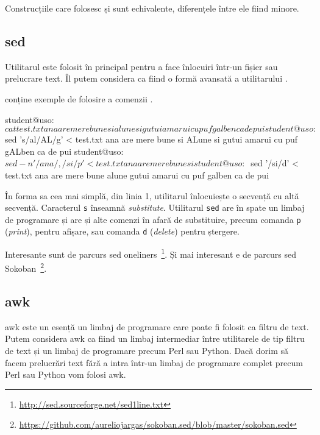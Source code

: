 Construcțiile care folosesc  și  sunt echivalente, diferențele între ele fiind minore.

\subsection{sed}
\label{sec:cli:advanced:sed}

Utilitarul  este folosit în principal pentru a face înlocuiri într-un fișier sau prelucrare text. Îl putem considera ca fiind o formă avansată a utilitarului .

 conține exemple de folosire a comenzii .

\begin{screen}[caption={Folosirea sed},label={lst:cli:sed}]
student@uso:~$ cat test.txt
ana
are
mere
bune
si
alune
si
gutui
amarui
cu
puf
galben
ca
de
pui
student@uso:~$ sed 's/al/AL/g' < test.txt
ana
are
mere
bune
si
ALune
si
gutui
amarui
cu
puf
gALben
ca
de
pui
student@uso:~$ sed -n '/ana/,/si/p' < test.txt
ana
are
mere
bune
si
student@uso:~$ sed '/si/d' < test.txt
ana
are
mere
bune
alune
gutui
amarui
cu
puf
galben
ca
de
pui
\end{screen}

În forma sa cea mai simplă, din linia 1, utilitarul înlocuiește o secvență cu altă secvență. Caracterul \texttt{s} înseamnă \textit{substitute}. Utilitarul \texttt{sed} are în spate un limbaj de programare și are și alte comenzi în afară de substituire, precum comanda \texttt{p} (\textit{print}), pentru afișare, sau comanda \texttt{d} (\textit{delete}) pentru ștergere.

Interesante sunt de parcurs sed oneliners~\footnote{\url{http://sed.sourceforge.net/sed1line.txt}}. Și mai interesant e de parcurs sed Sokoban~\footnote{\url{https://github.com/aureliojargas/sokoban.sed/blob/master/sokoban.sed}}.

\subsection{awk}
\label{sec:cli:advanced:awk}

awk este un esență un limbaj de programare care poate fi folosit ca filtru de
text. Putem considera awk ca fiind un limbaj intermediar între utilitarele de
tip filtru de text și un limbaj de programare precum Perl sau Python. Dacă dorim
să facem prelucrări text fără a intra într-un limbaj de programare complet
precum Perl sau Python vom folosi awk.

